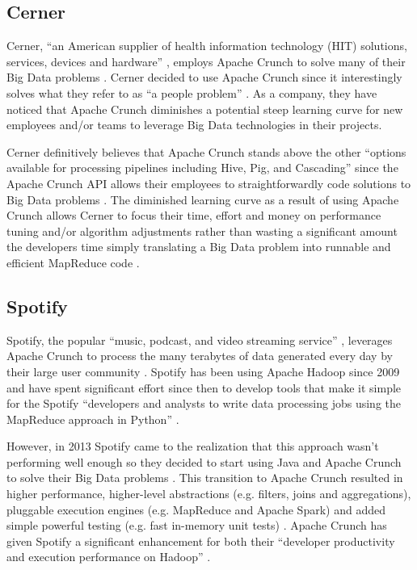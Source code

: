 \documentclass[9pt,twocolumn,twoside]{../../styles/osajnl}
\begin{document}
\subsection{Cerner} \label{cerner}
Cerner, ``an American supplier of health information technology (HIT)
solutions, services, devices and hardware'' \cite{www-cerner}, employs
Apache Crunch to solve many of their Big Data problems
\cite{www-crunch-cerner}. Cerner decided to use Apache Crunch since it
interestingly solves what they refer to as ``a people problem''
\cite{www-crunch-cerner}. As a company, they have noticed that Apache
Crunch diminishes a potential steep learning curve for new employees
and/or teams to leverage Big Data technologies in their projects.

Cerner definitively believes that Apache Crunch stands above the other
``options available for processing pipelines including Hive, Pig, and
Cascading'' since the Apache Crunch API allows their employees to
straightforwardly code solutions to Big Data problems
\cite{www-crunch-cerner, www-apache-hive, www-apache-pig,
  www-cascading}. The diminished learning curve as a result of using
Apache Crunch allows Cerner to focus their time, effort and money on
performance tuning and/or algorithm adjustments rather than wasting a
significant amount the developers time simply translating a Big Data
problem into runnable and efficient MapReduce code
\cite{www-crunch-cerner}.

\subsection{Spotify} \label{spotify}
Spotify, the popular ``music, podcast, and video streaming service''
\cite{www-spotify}, leverages Apache Crunch to process the many
terabytes of data generated every day by their large user community
\cite{www-crunch-spotify}. Spotify has been using Apache Hadoop since
2009 and have spent significant effort since then to develop tools
that make it simple for the Spotify ``developers and analysts to write
data processing jobs using the MapReduce approach in Python''
\cite{www-crunch-spotify, www-mapreduce}.

However, in 2013 Spotify came to the realization that this approach
wasn't performing well enough so they decided to start using Java and
Apache Crunch to solve their Big Data problems
\cite{www-crunch-spotify}. This transition to Apache Crunch resulted
in higher performance, higher-level abstractions (e.g.  filters, joins
and aggregations), pluggable execution engines (e.g. MapReduce and
Apache Spark) and added simple powerful testing (e.g. fast in-memory
unit tests) \cite{www-crunch-spotify}. Apache Crunch has given Spotify
a significant enhancement for both their ``developer productivity and
execution performance on Hadoop'' \cite{www-crunch-spotify}.
\end{document}
